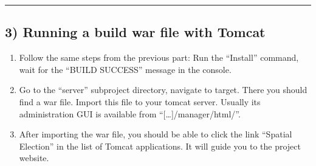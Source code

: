 \begin{center}\rule{3in}{0.4pt}\end{center}

\subsection{3) Running a build war file with
Tomcat}\label{running-a-build-war-file-with-tomcat}

\begin{enumerate}
\def\labelenumi{\arabic{enumi}.}
\itemsep1pt\parskip0pt
\item
  Follow the same steps from the previous part: Run the ``Install''
  command, wait for the ``BUILD SUCCESS'' message in the console.
\item
  Go to the ``server'' subproject directory, navigate to target. There
  you should find a war file. Import this file to your tomcat server.
  Usually its administration GUI is available from
  ``{[}\ldots{}{]}/manager/html/''.
\item
  After importing the war file, you should be able to click the link
  ``Spatial Election'' in the list of Tomcat applications. It will guide
  you to the project website.
\end{enumerate}